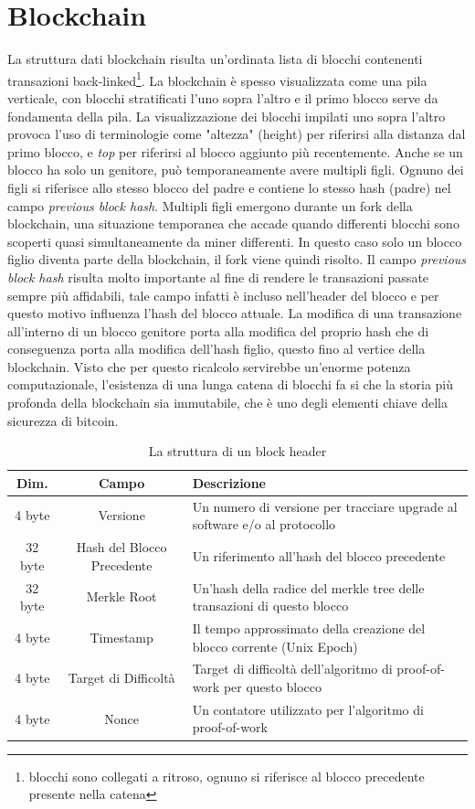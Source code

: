 \section{Blockchain}
La struttura dati blockchain risulta un'ordinata lista di blocchi contenenti transazioni back-linked\footnote{blocchi sono collegati a ritroso, ognuno si riferisce al blocco precedente presente nella catena}. La blockchain è spesso visualizzata come una pila verticale, con blocchi stratificati l'uno sopra l'altro e il primo blocco serve da fondamenta della pila. La visualizzazione dei blocchi impilati uno sopra l'altro provoca l'uso di terminologie come "altezza" (height) per riferirsi alla distanza dal primo blocco, e \textit{top} per riferirsi al blocco aggiunto più recentemente. Anche se un blocco ha solo un genitore, può temporaneamente avere multipli figli. Ognuno dei figli si riferisce allo stesso blocco del padre e contiene lo stesso hash (padre) nel campo \textit{previous block hash}. Multipli figli emergono durante un fork della blockchain, una situazione temporanea che accade quando differenti blocchi sono scoperti quasi simultaneamente da miner differenti. In questo caso solo un blocco figlio diventa parte della blockchain, il fork viene quindi risolto. Il campo \textit{previous block hash} risulta molto importante al fine di rendere le transazioni passate sempre più affidabili, tale campo infatti è incluso nell'header del blocco e per questo motivo influenza l'hash del blocco attuale. La modifica di una transazione all'interno di un blocco genitore porta alla modifica del proprio hash che di conseguenza porta alla modifica dell'hash figlio, questo fino al vertice della blockchain. Visto che per questo ricalcolo servirebbe un'enorme potenza computazionale, l'esistenza di una lunga catena di blocchi fa si che la storia più profonda della blockchain sia immutabile, che è uno degli elementi chiave della sicurezza di bitcoin.
\begin{table}[]
	\centering
	\begin{tabular}{|c|c|p{6cm}|}
		\hline
		\textbf{Dim.} 		&	\textbf{Campo} 					& \textbf{Descrizione} \\ \hline
		4 byte						& Versione 							& Un numero di versione per tracciare upgrade al software e/o al protocollo \\ \hline
		32 byte 					& Hash del Blocco Precedente 		& Un riferimento all'hash del blocco precedente \\ \hline
		32 byte 					& Merkle Root 						& Un'hash della radice del merkle tree delle transazioni di questo blocco \\ \hline
		4 byte 						& Timestamp 						& Il tempo approssimato della creazione del blocco corrente (Unix Epoch)\\ \hline
		4 byte	 					& Target di Difficoltà				& Target di difficoltà dell'algoritmo di proof-of-work per questo blocco \\ \hline
		4 byte 						& Nonce 							& Un contatore utilizzato per l'algoritmo di proof-of-work\\ \hline
	\end{tabular}
	\caption{La struttura di un block header}
	\label{tab:struttura-block-header}
\end{table}
